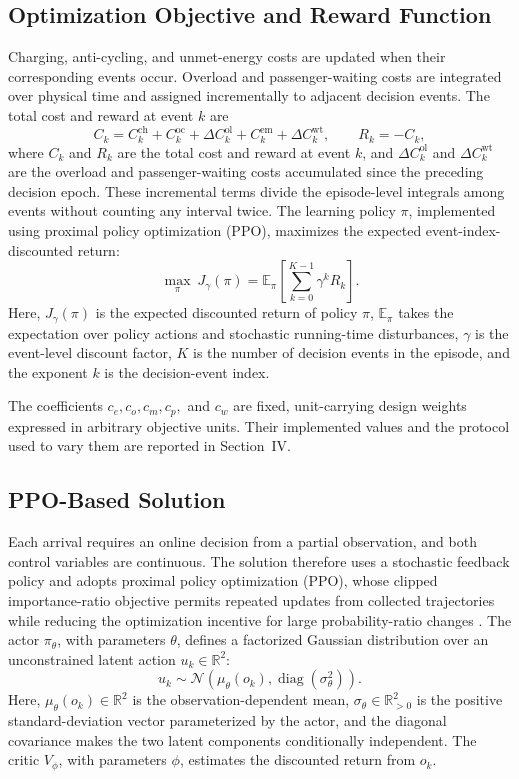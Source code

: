 \documentclass[conference]{IEEEtran}
\begin{document}
\subsection{Optimization Objective and Reward Function}
Charging, anti-cycling, and unmet-energy costs are updated when their corresponding events occur. Overload and passenger-waiting costs are integrated over physical time and assigned incrementally to adjacent decision events. The total cost and reward at event $k$ are
\begin{equation}
 C_k = C^{\mathrm{ch}}_k + C^{\mathrm{oc}}_k + \Delta C^{\mathrm{ol}}_k
 + C^{\mathrm{em}}_k + \Delta C^{\mathrm{wt}}_k,
 \qquad R_k=-C_k,
\end{equation}
where $C_k$ and $R_k$ are the total cost and reward at event $k$, and $\Delta C^{\mathrm{ol}}_k$ and $\Delta C^{\mathrm{wt}}_k$ are the overload and passenger-waiting costs accumulated since the preceding decision epoch. These incremental terms divide the episode-level integrals among events without counting any interval twice. The learning policy $\pi$, implemented using proximal policy optimization (PPO), maximizes the expected event-index-discounted return:
\begin{equation}
 \max_{\pi}\ J_{\gamma}(\pi)
 =\mathbb{E}_{\pi}\!\left[\sum_{k=0}^{K-1}\gamma^k R_k\right].
\end{equation}
Here, $J_{\gamma}(\pi)$ is the expected discounted return of policy $\pi$, $\mathbb{E}_{\pi}$ takes the expectation over policy actions and stochastic running-time disturbances, $\gamma$ is the event-level discount factor, $K$ is the number of decision events in the episode, and the exponent $k$ is the decision-event index.

The coefficients $c_e,c_o,c_m,c_p,$ and $c_w$ are fixed, unit-carrying design weights expressed in arbitrary objective units. Their implemented values and the protocol used to vary them are reported in Section~IV.

\subsection{PPO-Based Solution}
Each arrival requires an online decision from a partial observation, and both control variables are continuous. The solution therefore uses a stochastic feedback policy and adopts proximal policy optimization (PPO), whose clipped importance-ratio objective permits repeated updates from collected trajectories while reducing the optimization incentive for large probability-ratio changes \cite{schulman2017ppo}. The actor $\pi_\theta$, with parameters $\theta$, defines a factorized Gaussian distribution over an unconstrained latent action $u_k\in\mathbb{R}^2$:
\begin{equation}
 u_k\sim\mathcal{N}\!\left(\mu_\theta(o_k),
 \operatorname{diag}(\sigma_\theta^2)\right).
\end{equation}
Here, $\mu_\theta(o_k)\in\mathbb{R}^2$ is the observation-dependent mean, $\sigma_\theta\in\mathbb{R}_{>0}^2$ is the positive standard-deviation vector parameterized by the actor, and the diagonal covariance makes the two latent components conditionally independent. The critic $V_\phi$, with parameters $\phi$, estimates the discounted return from $o_k$.
\end{document}
